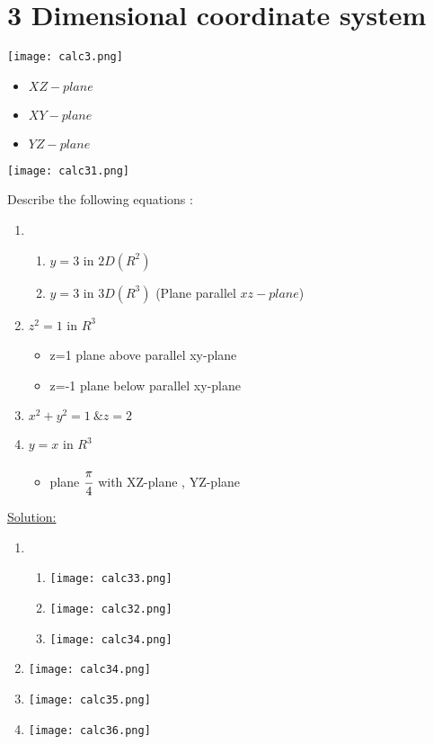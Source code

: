 \section{3 Dimensional coordinate system}
\texttt{[image: calc3.png]}\\
\begin{itemize}
    \item $XZ-plane$
    \item $XY-plane$
    \item $YZ-plane$
\end{itemize}
\texttt{[image: calc31.png]}\\
\begin{example}
Describe the following equations :
\begin{enumerate}
\item
\begin{enumerate}
    \item  $y=3$ in $2D(R^2)$
    \item $y=3$ in $3D(R^3)$ (Plane parallel $xz-plane$)
\end{enumerate}
    \item $z^2=1 $ in $R^3$ \begin{itemize}
        \item z=1 plane above parallel xy-plane
                \item z=-1 plane below parallel xy-plane
    \end{itemize}
\item $x^2+y^2=1 ~ \& z=2$
\item $y=x$ in $R^3$
\begin{itemize}
    \item plane $\cfrac{\pi}{4}$ with XZ-plane , YZ-plane
\end{itemize}
\end{enumerate}
{\color{smalt(darkpowderblue)}\underline {Solution:}}\\
\begin{enumerate}
    \item 
    \begin{enumerate}
     \item \texttt{[image: calc33.png]}\\
    \item \texttt{[image: calc32.png]}\\
        \item \texttt{[image: calc34.png]}\\
\end{enumerate}
           \item \texttt{[image: calc34.png]}\\
    \item \texttt{[image: calc35.png]}\\
    \item \texttt{[image: calc36.png]}\\
\end{enumerate}
\end{example}
